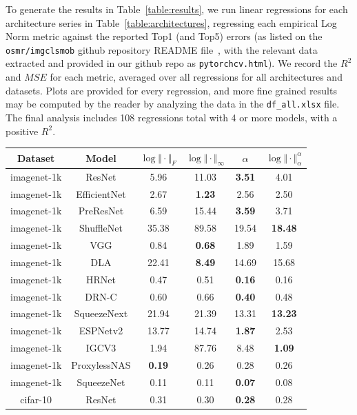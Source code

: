 To generate the results in Table~\ref{table:results}, we run linear regressions for each architecture series in Table~\ref{table:architectures}, regressing each empirical Log Norm metric against the reported Top1 (and Top5) errors (as listed on the \texttt{osmr/imgclsmob} github repository README file~\cite{osmr}, with the relevant data extracted and provided in our github repo as \texttt{pytorchcv.html}).
We record the $R^{2}$ and $MSE$ for each metric, averaged over all regressions for all architectures and datasets.
Plots are provided for every regression, and more fine grained results may be computed by the reader by analyzing the data in the \texttt{df\_all.xlsx} file.
The final analysis includes 108 regressions total with 4 or more models, with a positive $R^2$.

\begin{table}[t]
\begin{center}
\begin{tabular}{|c|c|c|c|c|c|}
\hline
Dataset & Model  & $\log\Vert\cdot\Vert_{F}$ & $\log\Vert\cdot\Vert_{\infty}$ & $\hat{\alpha}$ & $\log\Vert\cdot\Vert^{\alpha}_{\alpha}$ \\
\hline
 imagenet-1k & ResNet  & 5.96 &  11.03 & \textbf{3.51} & 4.01 \\
 imagenet-1k & EfficientNet  & 2.67 &  \textbf{1.23} & 2.56 & 2.50 \\
 imagenet-1k & PreResNet  & 6.59 &  15.44 & \textbf{3.59} & 3.71 \\
 imagenet-1k & ShuffleNet  & 35.38 &  89.58 & 19.54 & \textbf{18.48} \\
 imagenet-1k & VGG  & 0.84 &  \textbf{0.68} & 1.89 & 1.59 \\
 imagenet-1k & DLA  & 22.41 &  \textbf{8.49} & 14.69 & 15.68 \\
 imagenet-1k & HRNet  & 0.47 &  0.51 & \textbf{0.16} & 0.16 \\
 imagenet-1k & DRN-C  & 0.60 &  0.66 & \textbf{0.40} & 0.48 \\
 imagenet-1k & SqueezeNext  & 21.94 &  21.39 & 13.31 & \textbf{13.23} \\
 imagenet-1k & ESPNetv2  & 13.77 &  14.74 & \textbf{1.87} & 2.53 \\
 imagenet-1k & IGCV3  & 1.94 &  87.76 & 8.48 & \textbf{1.09} \\
 imagenet-1k & ProxylessNAS  & \textbf{0.19} &  0.26 & 0.28 & 0.26 \\
 imagenet-1k & SqueezeNet  & 0.11 &  0.11 & \textbf{0.07} & 0.08 \\
\hline
 cifar-10 & ResNet  & 0.31 &  0.30 & \textbf{0.28} & 0.28 \\

\end{tabular}
\end{center}
\end{table}
